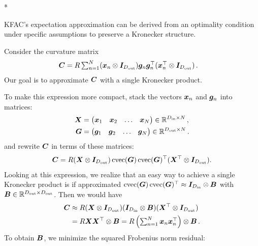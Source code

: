 \switchcolumn[1]*
\begin{example}
  \label{ex:just_kfac_exp_approx}
  KFAC's expectation approximation can be derived from an optimality condition under specific assumptions to preserve a Kronecker structure.

  Consider the curvature matrix
  \begin{align*}
    {\bm{C}}
    &=
      \textstyle
      R \sum_{n=1}^N
      ({\bm{x}}_n \otimes {\bm{I}}_{D_{\text{out}}})
      {\bm{g}}_n {\bm{g}}_n^{\top}
      ({\bm{x}}_n^{\top} \otimes {\bm{I}}_{D_{\text{out}}})\,.
  \end{align*}
  Our goal is to approximate ${\bm{C}}$ with a single Kronecker product.

  To make this expression more compact, stack the vectors ${\bm{x}}_n$ and ${\bm{g}}_n$ into matrices:
  \begin{align*}
    {\bm{X}}
    &=
      \begin{pmatrix}
        {\bm{x}}_1 & {\bm{x}}_2 & \ldots & {\bm{x}}_N
      \end{pmatrix}
      \in {\mathbb{R}}^{D_{\text{in}} \times N}\,,
    \\
    {\bm{G}}
    &=
      \begin{pmatrix}
        {\bm{g}}_1 & {\bm{g}}_2 & \ldots & {\bm{g}}_N
      \end{pmatrix}
      \in {\mathbb{R}}^{D_{\text{out}} \times N}\,.
  \end{align*}
  and rewrite ${\bm{C}}$ in terms of these matrices:
  \begin{align*}
    {\bm{C}} = R ({\bm{X}} \otimes {\bm{I}}_{D_{\text{out}}}) \operatorname{cvec}({\bm{G}}) \operatorname{cvec}({\bm{G}})^{\top}({\bm{X}}^{\top} \otimes {\bm{I}}_{D_{\text{out}}}).
  \end{align*}
  Looking at this expression, we realize that an easy way to achieve a single Kronecker product is if approximated $\operatorname{cvec}({\bm{G}}) \operatorname{cvec}({\bm{G}})^{\top} \approx {\bm{I}}_{D_{\text{in}}} \otimes {\bm{B}}$ with ${\bm{B}} \in {\mathbb{R}}^{D_{\text{out}}\times D_{\text{out}}}$.
  Then we would have
  \begin{align*}
    {\bm{C}}
    &\approx
      R ({\bm{X}} \otimes {\bm{I}}_{D_{\text{out}}})
      ({\bm{I}}_{D_{\text{in}}} \otimes {\bm{B}})
      ({\bm{X}}^{\top} \otimes {\bm{I}}_{D_{\text{out}}})
    \\
    &=
      R {\bm{X}} {\bm{X}}^{\top} \otimes {\bm{B}}
      =
      \textstyle
      R \left(\sum_{n=1}^N {\bm{x}}_n {\bm{x}}_n^{\top}\right) \otimes {\bm{B}}\,.
  \end{align*}
  To obtain ${\bm{B}}$, we minimize the squared Frobenius norm residual:
  \begin{align*}
    \begin{split}

\end{split}
\end{align*}
\end{example}
